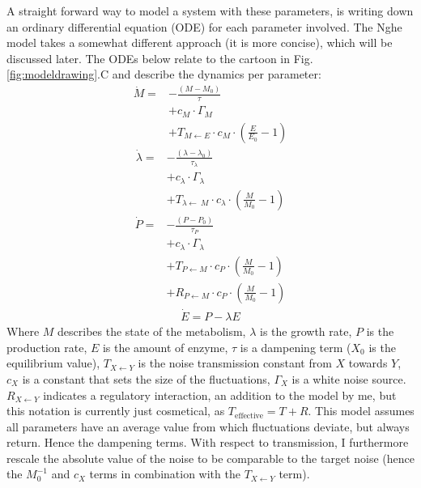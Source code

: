 \documentclass[a4paper,twoside,10pt]{report}
\begin{document}
A straight forward way to model a system with these parameters, is writing down an ordinary differential equation (ODE) for each parameter involved. 
%
The Nghe model takes a somewhat different approach (it is more concise), which will be discussed later.
%
The ODEs below relate to the cartoon in Fig. \ref{fig:modeldrawing}.C
and describe the dynamics per parameter:
%
\begin{align}
\label{myfirstequation}
\dot{M} = & - \frac{(M-M_0)}{\tau}  \nonumber \\ 
          & + c_M \cdot \Gamma_M  \nonumber \\ %
          & + T_{M\leftarrow E} \cdot c_M \cdot (\frac{E}{E_0} - 1)  
\end{align}
%
%
\begin{align}
	\dot{\lambda} = & -\frac{(\lambda - \lambda_0 )}{\tau_\lambda} \nonumber \\ 
 			& + c_\lambda \cdot \Gamma_\lambda \nonumber \\  %
			& +    T_{\lambda\leftarrow\ M} \cdot c_\lambda \cdot (\frac{M}{M_0}-1) 
\end{align}
%
\begin{align}
\label{mythirdequation}
\dot{P} = & - \frac{(P-P_0)}{\tau_P} \nonumber \\ 
		 & + c_\lambda \cdot \Gamma_\lambda \nonumber \\ 
         & + T_{P\leftarrow M} \cdot c_P \cdot (\frac{M}{M_0}-1)  \nonumber \\ 
         & + R_{P\leftarrow M} \cdot c_P \cdot (\frac{M}{M_0}-1)
\end{align}
%
\begin{align}
\label{mylastequation}
\dot{E} = P - \lambda E
\end{align}
%
Where $M$ describes the state of the metabolism, $\lambda$ is the growth rate, $P$ is the production rate, $E$ is the amount of enzyme, $\tau$ is a dampening term ($X_0$ is the equilibrium value), $T_{X \leftarrow Y}$ is the noise transmission constant from $X$ towards $Y$, $c_X$ is a constant that sets the size of the fluctuations, $\Gamma_X$ is a white noise source.
$R_{X \leftarrow Y}$ indicates a regulatory interaction, an addition to the model by me, but this notation is currently just cosmetical, as $T_\text{effective}=T+R$.
%
This model assumes all parameters have an average value from which fluctuations deviate, but always return. Hence the dampening terms.
With respect to transmission, I furthermore rescale the absolute value of the noise to be comparable to the target noise (hence the $M_0^{-1}$ and $c_X$ terms in combination with the $T_{X\leftarrow Y}$ term).
\end{document}
